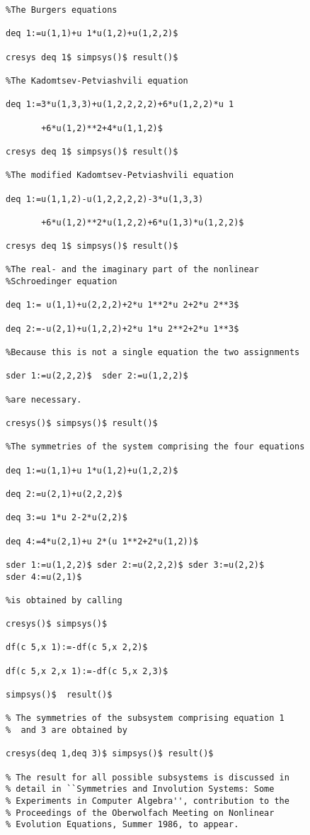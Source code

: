 \begin{verbatim}
%The Burgers equations

deq 1:=u(1,1)+u 1*u(1,2)+u(1,2,2)$

cresys deq 1$ simpsys()$ result()$

%The Kadomtsev-Petviashvili equation

deq 1:=3*u(1,3,3)+u(1,2,2,2,2)+6*u(1,2,2)*u 1

       +6*u(1,2)**2+4*u(1,1,2)$

cresys deq 1$ simpsys()$ result()$

%The modified Kadomtsev-Petviashvili equation

deq 1:=u(1,1,2)-u(1,2,2,2,2)-3*u(1,3,3)

       +6*u(1,2)**2*u(1,2,2)+6*u(1,3)*u(1,2,2)$

cresys deq 1$ simpsys()$ result()$

%The real- and the imaginary part of the nonlinear
%Schroedinger equation

deq 1:= u(1,1)+u(2,2,2)+2*u 1**2*u 2+2*u 2**3$

deq 2:=-u(2,1)+u(1,2,2)+2*u 1*u 2**2+2*u 1**3$

%Because this is not a single equation the two assignments

sder 1:=u(2,2,2)$  sder 2:=u(1,2,2)$

%are necessary.

cresys()$ simpsys()$ result()$

%The symmetries of the system comprising the four equations

deq 1:=u(1,1)+u 1*u(1,2)+u(1,2,2)$

deq 2:=u(2,1)+u(2,2,2)$

deq 3:=u 1*u 2-2*u(2,2)$

deq 4:=4*u(2,1)+u 2*(u 1**2+2*u(1,2))$

sder 1:=u(1,2,2)$ sder 2:=u(2,2,2)$ sder 3:=u(2,2)$
sder 4:=u(2,1)$

%is obtained by calling

cresys()$ simpsys()$

df(c 5,x 1):=-df(c 5,x 2,2)$

df(c 5,x 2,x 1):=-df(c 5,x 2,3)$

simpsys()$  result()$

% The symmetries of the subsystem comprising equation 1
%  and 3 are obtained by

cresys(deq 1,deq 3)$ simpsys()$ result()$

% The result for all possible subsystems is discussed in
% detail in ``Symmetries and Involution Systems: Some
% Experiments in Computer Algebra'', contribution to the
% Proceedings of the Oberwolfach Meeting on Nonlinear
% Evolution Equations, Summer 1986, to appear.
\end{verbatim}


